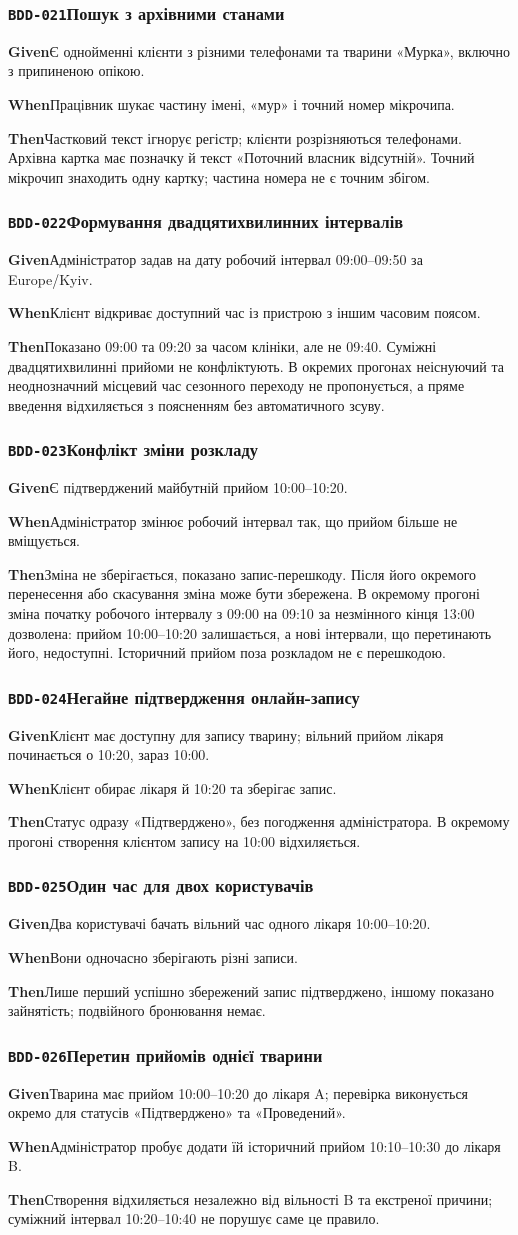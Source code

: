 \documentclass[11pt,a4paper]{article}
\newcommand{\scenario}[5]{%
  \Needspace{8\baselineskip}%
  \subsubsection*{\hypertarget{#1}{\texttt{#1}}\quad #2}%
  \textbf{Given}\quad #3\par
  \textbf{When}\quad #4\par
  \textbf{Then}\quad #5\par\medskip}
\begin{document}
\scenario{BDD-021}{Пошук з архівними станами}{Є однойменні клієнти з різними телефонами та тварини «Мурка», включно з припиненою опікою.}{Працівник шукає частину імені, «мур» і точний номер мікрочипа.}{Частковий текст ігнорує регістр; клієнти розрізняються телефонами. Архівна картка має позначку й текст «Поточний власник відсутній». Точний мікрочип знаходить одну картку; частина номера не є точним збігом.}

\scenario{BDD-022}{Формування двадцятихвилинних інтервалів}{Адміністратор задав на дату робочий інтервал 09:00–09:50 за Europe/Kyiv.}{Клієнт відкриває доступний час із пристрою з іншим часовим поясом.}{Показано 09:00 та 09:20 за часом клініки, але не 09:40. Суміжні двадцятихвилинні прийоми не конфліктують. В окремих прогонах неіснуючий та неоднозначний місцевий час сезонного переходу не пропонується, а пряме введення відхиляється з поясненням без автоматичного зсуву.}

\scenario{BDD-023}{Конфлікт зміни розкладу}{Є підтверджений майбутній прийом 10:00–10:20.}{Адміністратор змінює робочий інтервал так, що прийом більше не вміщується.}{Зміна не зберігається, показано запис-перешкоду. Після його окремого перенесення або скасування зміна може бути збережена. В окремому прогоні зміна початку робочого інтервалу з 09:00 на 09:10 за незмінного кінця 13:00 дозволена: прийом 10:00–10:20 залишається, а нові інтервали, що перетинають його, недоступні. Історичний прийом поза розкладом не є перешкодою.}

\scenario{BDD-024}{Негайне підтвердження онлайн-запису}{Клієнт має доступну для запису тварину; вільний прийом лікаря починається о 10:20, зараз 10:00.}{Клієнт обирає лікаря й 10:20 та зберігає запис.}{Статус одразу «Підтверджено», без погодження адміністратора. В окремому прогоні створення клієнтом запису на 10:00 відхиляється.}

\scenario{BDD-025}{Один час для двох користувачів}{Два користувачі бачать вільний час одного лікаря 10:00–10:20.}{Вони одночасно зберігають різні записи.}{Лише перший успішно збережений запис підтверджено, іншому показано зайнятість; подвійного бронювання немає.}

\scenario{BDD-026}{Перетин прийомів однієї тварини}{Тварина має прийом 10:00–10:20 до лікаря A; перевірка виконується окремо для статусів «Підтверджено» та «Проведений».}{Адміністратор пробує додати їй історичний прийом 10:10–10:30 до лікаря B.}{Створення відхиляється незалежно від вільності B та екстреної причини; суміжний інтервал 10:20–10:40 не порушує саме це правило.}
\end{document}
